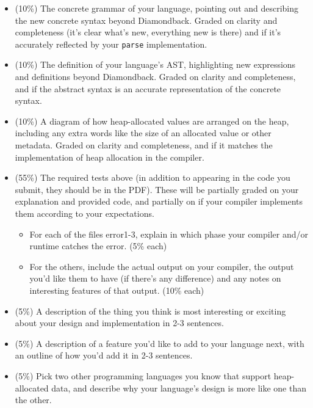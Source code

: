 \documentclass[10pt, oneside]{article}
\begin{document}
\begin{itemize}

\item (10\%) The concrete grammar of your language, pointing out and
describing the new concrete syntax beyond Diamondback. Graded on clarity and
completeness (it's clear what's new, everything new is there) and if it's
accurately reflected by your {\tt parse} implementation.

\item (10\%) The definition of your language's AST, highlighting new
expressions and definitions beyond Diamondback. Graded on clarity and
completeness, and if the abstract syntax is an accurate representation of the
concrete syntax.

\item (10\%) A diagram of how heap-allocated values are arranged on the heap,
including any extra words like the size of an allocated value or other
metadata. Graded on clarity and completeness, and if it matches the
implementation of heap allocation in the compiler.

\item (55\%) The required tests above (in addition to appearing in the code
you submit, they should be in the PDF). These will be partially graded on
your explanation and provided code, and partially on if your compiler
implements them according to your expectations.

  \begin{itemize}

    \item For each of the files error1-3, explain in which phase your
    compiler and/or runtime catches the error. (5\% each)

    \item For the others, include the actual output on your compiler, the
    output you'd like them to have (if there's any difference) and any notes
    on interesting features of that output. (10\% each)
  \end{itemize}

  \item (5\%) A description of the thing you think is most interesting or
  exciting about your design and implementation in 2-3 sentences.

  \item (5\%) A description of a feature you'd like to add to your language
  next, with an outline of how you'd add it in 2-3 sentences.

  \item (5\%) Pick two other programming languages you know that support
  heap-allocated data, and describe why your language's design is more like
  one than the other.

\end{itemize}
\end{document}
